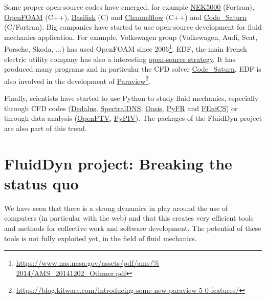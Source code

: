 Some proper open-source codes have emerged, for example
\href{https://nek5000.mcs.anl.gov/}{NEK5000} (Fortran),
\href{https://www.openfoam.com/}{OpenFOAM} (C++),
\href{http://basilisk.fr}{Basilisk} (C) and
\href{http://channelflow.org/}{Channelflow} (C++) and
\href{https://www.code-saturne.org}{Code\_Saturn} (C/Fortran).
%
Big companies have started to use open-source development for fluid mechanics
application. For example, Volkswagen group (Volkswagen, Audi, Seat, Porsche,
Skoda, ...) has used OpenFOAM since
2006\footnote{\url{https://www.nas.nasa.gov/assets/pdf/ams/%
2014/AMS_20141202_Othmer.pdf}}.
%
EDF, the main French electric utility company has also a interesting
\href{http://linuxfr.org/news/strat\%C3\%A9gie-open-source-\%C3\%A0-edf-rd}{%
open-source strategy}.  It has produced many programs and in particular the CFD
solver \href{https://www.code-saturne.org}{Code\_Saturn}.
%
EDF is also involved in the development of
\href{https://www.paraview.org/}{Paraview}\footnote{\url{https://blog.kitware.com/introducing-some-new-paraview-5-0-features/}}.

Finally, scientists have started to use Python to study fluid mechanics,
especially through CFD codes (\href{http://dedalus-project.org/}{Dedalus},
\href{https://github.com/spectralDNS}{SpectralDNS},
\href{https://github.com/mikaem/Oasis}{Oasis}, \href{http://pyfr.org/}{PyFR}
and \href{https://fenicsproject.org/}{FEniCS}) or through data analysis
(\href{http://www.openptv.net/}{OpenPTV},
\href{https://github.com/jr7/pypiv}{PyPIV}).
%
The packages of the FluidDyn project are also part of this trend.

\section{FluidDyn project: Breaking the status quo}

We have seen that there is a strong dynamics in play around the use of
computers (in particular with the web) and that this creates very efficient
tools and methods for collective work and software development.
%
The potential of these tools is not fully exploited yet, in the field of fluid
mechanics.

